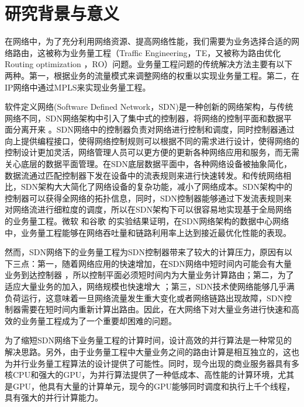\documentclass[master]{thesis-uestc}
\begin{document}
\thesistableofcontents
\thesischapterexordium
\section{研究背景与意义}

在网络中，为了充分利用网络资源、提高网络性能，我们需要为业务选择合适的网络路由，这被称为业务量工程（Traffic Engineering，TE，又被称为路由优化 Routing optimization ，RO）问题。业务量工程问题的传统解决方法主要有以下两种。第一，根据业务的流量模式来调整网络的权重以实现业务量工程。第二，在IP网络中通过MPLS来实现业务量工程。

软件定义网络(Software Defined Network，SDN)是一种创新的网络架构，与传统网络不同，SDN网络架构中引入了集中式的控制器，将网络的控制平面和数据平面分离开来 。SDN网络中的控制器负责对网络进行控制和调度，同时控制器通过向上提供编程接口，使得网络控制规则可以根据不同的需求进行设计，使得网络的控制设计更加灵活，网络管理人员可以更方便的更新各种网络应用和服务，而无需关心底层的数据平面管理。在SDN底层数据平面中，各种网络设备被抽象简化，数据流通过匹配控制器下发在设备中的流表规则来进行快速转发。和传统网络相比，SDN架构大大简化了网络设备的复杂功能，减小了网络成本。SDN架构中的控制器可以获得全网络的拓扑信息，同时，SDN控制器能够通过下发流表规则来对网络流进行细粒度的调度，所以在SDN架构下可以很容易地实现基于全局网络的业务量工程。微软 和谷歌 的实验结果证明，在SDN网络架构的数据中心网络中，业务量工程能够在网络吞吐量和链路利用率上达到接近最优化性能的表现。

然而，SDN网络下的业务量工程为SDN控制器带来了较大的计算压力，原因有以下三点：第一，随着网络应用的快速增加，在SDN网络中短时间内可能会有大量业务到达控制器 ，所以控制平面必须短时间内为大量业务计算路由；第二，为了适应大量业务的加入，网络规模也快速增大 ；第三，SDN技术使网络能够几乎满负荷运行，这意味着一旦网络流量发生重大变化或者网络链路出现故障，SDN控制器需要在短时间内重新计算出路由。因此，在大网络下对大量业务进行快速和高效的业务量工程成为了一个重要却困难的问题。

为了缩短SDN网络下业务量工程的计算时间，设计高效的并行算法是一种常见的解决思路。另外，由于业务量工程中大量业务之间的路由计算是相互独立的，这也为并行业务量工程算法的设计提供了可能性。同时，现今出现的商业服务器具有多核CPU和强大的GPU，为并行算法提供了一种低成本、高性能的计算环境，尤其是GPU，他具有大量的计算单元，现今的GPU能够同时调度和执行上千个线程，具有强大的并行计算能力。
\end{document}
